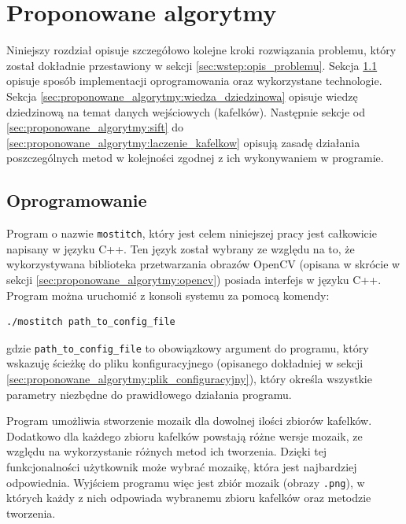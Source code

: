 %
\chapter{Proponowane algorytmy}
\label{sec:proponowane_algorytmy}

Niniejszy rozdział opisuje szczegółowo kolejne kroki rozwiązania problemu, który został dokładnie przestawiony w sekcji \ref{sec:wstep:opis_problemu}. Sekcja \ref{sec:proponowane_algorytmy:oprogramowanie} opisuje sposób implementacji oprogramowania oraz wykorzystane technologie. Sekcja \ref{sec:proponowane_algorytmy:wiedza_dziedzinowa} opisuje wiedzę dziedzinową na temat danych wejściowych (kafelków). Następnie sekcje od \ref{sec:proponowane_algorytmy:sift} do \ref{sec:proponowane_algorytmy:laczenie_kafelkow} opisują zasadę działania poszczególnych metod w kolejności zgodnej z ich wykonywaniem w programie.

\section{Oprogramowanie}
\label{sec:proponowane_algorytmy:oprogramowanie}

Program o nazwie \texttt{mostitch}, który jest celem niniejszej pracy jest całkowicie napisany w języku C++. Ten język został wybrany ze względu na to, że wykorzystywana biblioteka przetwarzania obrazów OpenCV (opisana w skrócie w sekcji \ref{sec:proponowane_algorytmy:opencv}) posiada interfejs w języku C++. Program można uruchomić z konsoli systemu za pomocą komendy:

\begin{verbatim}
./mostitch path_to_config_file
\end{verbatim}

gdzie \texttt{path\_to\_config\_file} to obowiązkowy argument do programu, który wskazuję ścieżkę do pliku konfiguracyjnego (opisanego dokładniej w sekcji \ref{sec:proponowane_algorytmy:plik_configuracyjny}), który określa wszystkie parametry niezbędne do prawidłowego działania programu.

Program umożliwia stworzenie mozaik dla dowolnej ilości zbiorów kafelków. Dodatkowo dla każdego zbioru kafelków powstają różne wersje mozaik, ze względu na wykorzystanie różnych metod ich tworzenia. Dzięki tej funkcjonalności użytkownik może wybrać mozaikę, która jest najbardziej odpowiednia. Wyjściem programu więc jest zbiór mozaik (obrazy \texttt{.png}), w których każdy z nich odpowiada wybranemu zbioru kafelków oraz metodzie tworzenia.

